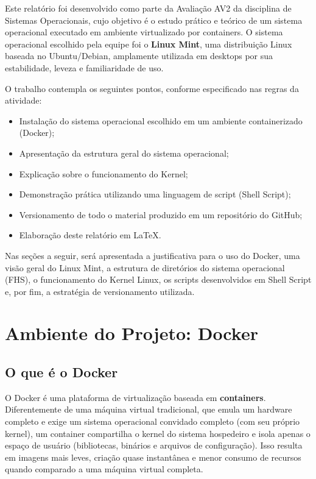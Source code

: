 \documentclass[a4paper,12pt]{article}
\begin{document}
Este relatório foi desenvolvido como parte da Avaliação AV2 da disciplina de
Sistemas Operacionais, cujo objetivo é o estudo prático e teórico de um
sistema operacional executado em ambiente virtualizado por containers. O
sistema operacional escolhido pela equipe foi o \textbf{Linux Mint}, uma
distribuição Linux baseada no Ubuntu/Debian, amplamente utilizada em desktops
por sua estabilidade, leveza e familiaridade de uso.

O trabalho contempla os seguintes pontos, conforme especificado nas regras da
atividade:

\begin{itemize}
    \item Instalação do sistema operacional escolhido em um ambiente
          containerizado (Docker);
    \item Apresentação da estrutura geral do sistema operacional;
    \item Explicação sobre o funcionamento do Kernel;
    \item Demonstração prática utilizando uma linguagem de script
          (Shell Script);
    \item Versionamento de todo o material produzido em um repositório
          do GitHub;
    \item Elaboração deste relatório em \LaTeX.
\end{itemize}

Nas seções a seguir, será apresentada a justificativa para o uso do Docker,
uma visão geral do Linux Mint, a estrutura de diretórios do sistema
operacional (FHS), o funcionamento do Kernel Linux, os scripts desenvolvidos
em Shell Script e, por fim, a estratégia de versionamento utilizada.


\section{Ambiente do Projeto: Docker}

\subsection{O que é o Docker}

O Docker é uma plataforma de virtualização baseada em \textbf{containers}.
Diferentemente de uma máquina virtual tradicional, que emula um hardware
completo e exige um sistema operacional convidado completo (com seu próprio
kernel), um container compartilha o kernel do sistema hospedeiro e isola
apenas o espaço de usuário (bibliotecas, binários e arquivos de
configuração). Isso resulta em imagens mais leves, criação quase instantânea
e menor consumo de recursos quando comparado a uma máquina virtual completa.
\end{document}

